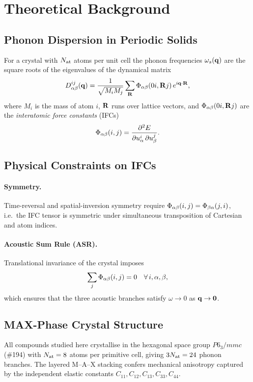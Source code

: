 \section{Theoretical Background}

\subsection{Phonon Dispersion in Periodic Solids}

For a crystal with $N_{\rm at}$ atoms per unit cell the phonon
frequencies $\omega_s(\mathbf{q})$ are the square roots of the eigenvalues
of the dynamical matrix
\begin{equation}
  D_{\alpha\beta}^{ij}(\mathbf{q})
  = \frac{1}{\sqrt{M_i M_j}}
    \sum_{\mathbf{R}} \Phi_{\alpha\beta}(0i, \mathbf{R} j)\,
    e^{i\mathbf{q}\cdot\mathbf{R}},
  \label{eq:dynmat}
\end{equation}
where $M_i$ is the mass of atom $i$, $\mathbf{R}$ runs over lattice vectors,
and $\Phi_{\alpha\beta}(0i,\mathbf{R} j)$ are the
\emph{interatomic force constants} (IFCs)
\begin{equation}
  \Phi_{\alpha\beta}(i,j)
  = \frac{\partial^2 E}{\partial u_\alpha^i\, \partial u_\beta^j}.
  \label{eq:ifc_def}
\end{equation}

\subsection{Physical Constraints on IFCs}

\paragraph{Symmetry.}
Time-reversal and spatial-inversion symmetry require
$\Phi_{\alpha\beta}(i,j) = \Phi_{\beta\alpha}(j,i)$,
i.e.~the IFC tensor is symmetric under simultaneous transposition
of Cartesian and atom indices.

\paragraph{Acoustic Sum Rule (ASR).}
Translational invariance of the crystal imposes
\begin{equation}
  \sum_j \Phi_{\alpha\beta}(i,j) = 0
  \quad \forall\, i,\alpha,\beta,
  \label{eq:asr}
\end{equation}
which ensures that the three acoustic branches satisfy
$\omega\to 0$ as $\mathbf{q}\to\bm{0}$.

\subsection{MAX-Phase Crystal Structure}

All compounds studied here crystallise in the hexagonal
space group $P6_3/mmc$ (\#194) with $N_{\rm at}=8$ atoms per
primitive cell, giving $3N_{\rm at}=24$ phonon branches.
The layered M--A--X stacking confers mechanical anisotropy
captured by the independent elastic constants
$C_{11}, C_{12}, C_{13}, C_{33}, C_{44}$.
